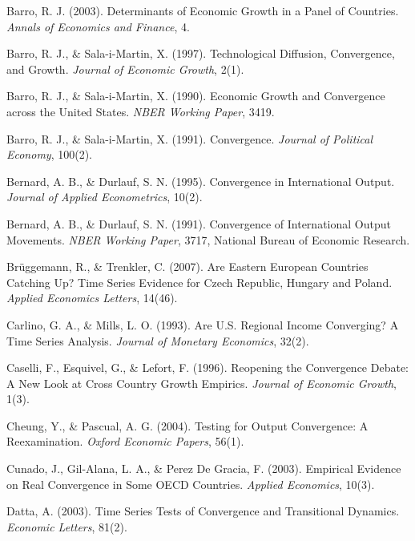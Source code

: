 \documentclass{crebsshr}
\begin{document}
\begin{thebibliography}{160}

Barro, R. J. (2003). Determinants of Economic Growth in a Panel of Countries. \emph{Annals of Economics and Finance}, 4.

Barro, R. J., \& Sala-i-Martin, X. (1997). Technological Diffusion, Convergence, and Growth. \emph{Journal of Economic Growth}, 2(1).

Barro, R. J., \& Sala-i-Martin, X. (1990). Economic Growth and Convergence across the United States. \emph{NBER Working Paper}, 3419.

Barro, R. J., \& Sala-i-Martin, X. (1991). Convergence. \emph{Journal of Political Economy}, 100(2).

Bernard, A. B., \& Durlauf, S. N. (1995). Convergence in International Output. \emph{Journal of Applied Econometrics}, 10(2).

Bernard, A. B., \& Durlauf, S. N. (1991). Convergence of International Output Movements. \emph{NBER Working Paper}, 3717, National Bureau of Economic Research.

Brüggemann, R., \& Trenkler, C. (2007). Are Eastern European Countries Catching Up? Time Series Evidence for Czech Republic, Hungary and Poland. \emph{Applied Economics Letters}, 14(46).

Carlino, G. A., \& Mills, L. O. (1993). Are U.S. Regional Income Converging? A Time Series Analysis. \emph{Journal of Monetary Economics}, 32(2).

Caselli, F., Esquivel, G., \& Lefort, F. (1996). Reopening the Convergence Debate: A New Look at Cross Country Growth Empirics. \emph{Journal of Economic Growth}, 1(3).

Cheung, Y., \& Pascual, A. G. (2004). Testing for Output Convergence: A Reexamination. \emph{Oxford Economic Papers}, 56(1).

Cunado, J., Gil-Alana, L. A., \& Perez De Gracia, F. (2003). Empirical Evidence on Real Convergence in Some OECD Countries. \emph{Applied Economics}, 10(3).

Datta, A. (2003). Time Series Tests of Convergence and Transitional Dynamics. \emph{Economic Letters}, 81(2).


\end{thebibliography}
\end{document}
